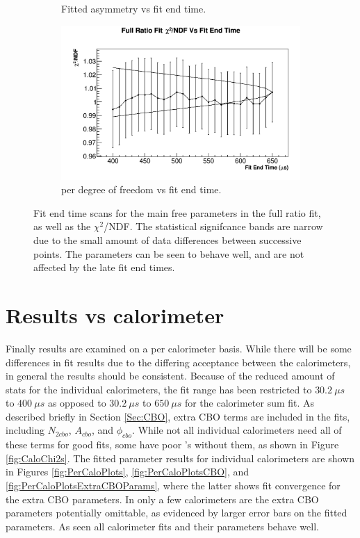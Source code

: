 \begin{figure}[]
\begin{subfigure}[t]{0.45\textwidth}
		    \caption{Fitted asymmetry vs fit end time.}
	    \end{subfigure}
	    \begin{subfigure}[t]{0.45\textwidth}
		    \centering
			\includegraphics[width=\textwidth]{RatioCBO_Chi2NDF_Vs_FE_canv}
		    \caption{\chisq per degree of freedom vs fit end time.}
	    \end{subfigure}%
	\caption[FitEndScans]{Fit end time scans for the main free parameters in the full ratio fit, as well as the $\chi^{2}$/NDF. The statistical signifcance bands are narrow due to the small amount of data differences between successive points. The parameters can be seen to behave well, and are not affected by the late fit end times.}
	\label{fig:FitEndScans}
	\end{figure}


\clearpage

\section{Results vs calorimeter}

	Finally results are examined on a per calorimeter basis. While there will be some differences in fit results due to the differing acceptance between the calorimeters, in general the results should be consistent. Because of the reduced amount of stats for the individual calorimeters, the fit range has been restricted to $\SI{30.2}{\mu s}$ to $\SI{400}{\mu s}$ as opposed to $\SI{30.2}{\mu s}$ to $\SI{650}{\mu s}$ for the calorimeter sum fit. As described briefly in Section \ref{Sec:CBO}, extra CBO terms are included in the fits, including $N_{2cbo}$, $A_{cbo}$, and $\phi_{cbo}$. While not all individual calorimeters need all of these terms for good fits, some have poor \chisq's without them, as shown in Figure \ref{fig:CaloChi2s}. The fitted parameter results for individual calorimeters are shown in Figures \ref{fig:PerCaloPlots}, \ref{fig:PerCaloPlotsCBO}, and \ref{fig:PerCaloPlotsExtraCBOParams}, where the latter shows fit convergence for the extra CBO parameters. In only a few calorimeters are the extra CBO parameters potentially omittable, as evidenced by larger error bars on the fitted parameters. As seen all calorimeter fits and their parameters behave well.

